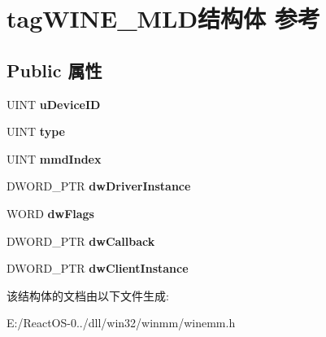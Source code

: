 \hypertarget{structtag_w_i_n_e___m_l_d}{}\section{tag\+W\+I\+N\+E\+\_\+\+M\+L\+D结构体 参考}
\label{structtag_w_i_n_e___m_l_d}
\subsection*{Public 属性}
\begin{DoxyCompactItemize}
\item 
\mbox{\label{structtag_w_i_n_e___m_l_d_a93a97b26afb1444fa3b87663fb6d18e9}} 
U\+I\+NT {\bfseries u\+Device\+ID}
\item 
\mbox{\label{structtag_w_i_n_e___m_l_d_a90a7717d5cff191812eb8d98f97e1256}} 
U\+I\+NT {\bfseries type}
\item 
\mbox{\label{structtag_w_i_n_e___m_l_d_a68d5ebfb16b1eb4edacf9ea37f04eaba}} 
U\+I\+NT {\bfseries mmd\+Index}
\item 
\mbox{\label{structtag_w_i_n_e___m_l_d_a7790f169d23806d483d78fe4d96bdd10}} 
D\+W\+O\+R\+D\+\_\+\+P\+TR {\bfseries dw\+Driver\+Instance}
\item 
\mbox{\label{structtag_w_i_n_e___m_l_d_a2c798b2ee494d2c21bb0fea055f7122a}} 
W\+O\+RD {\bfseries dw\+Flags}
\item 
\mbox{\label{structtag_w_i_n_e___m_l_d_a05370072576f8893515b9817fb667771}} 
D\+W\+O\+R\+D\+\_\+\+P\+TR {\bfseries dw\+Callback}
\item 
\mbox{\label{structtag_w_i_n_e___m_l_d_a55970d5b43d712cd5bdf4b9f446c6999}} 
D\+W\+O\+R\+D\+\_\+\+P\+TR {\bfseries dw\+Client\+Instance}
\end{DoxyCompactItemize}


该结构体的文档由以下文件生成\+:\begin{DoxyCompactItemize}
\item 
E\+:/\+React\+O\+S-\/0../dll/win32/winmm/winemm.\+h\end{DoxyCompactItemize}
